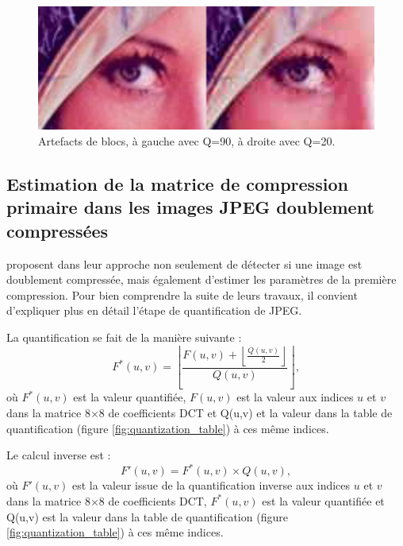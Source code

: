 \documentclass[utf8,final]{stageM2R} %
\begin{document}
\begin{figure}[H]
  \begin{center}
    \includegraphics[width=120mm]{images/eyes.png}
    \caption{Artefacts de blocs, à gauche avec Q=90, à droite avec Q=20.}
    \label{fig:blocs_artefacts}
  \end{center}
\end{figure}


\subsection{Estimation de la matrice de compression primaire dans les images JPEG doublement compressées}
\label{estimation_matrice_compression}
 \autocite{lukavs2003estimation} proposent dans leur approche non seulement de détecter si une image est doublement compressée, mais également d'estimer les paramètres de la première compression. Pour bien comprendre la suite de leurs travaux, il convient d'expliquer plus en détail l'étape de quantification de JPEG.

La quantification se fait de la manière suivante :
\begin{equation}
  F^*(u,v) = \left \lfloor \frac{F(u,v) + \left \lfloor \frac{Q(u,v)}{2} \right \rfloor }{Q(u,v)} \right \rfloor,
  \label{eqn:quantization}
\end{equation}
où $F^*(u,v)$ est la valeur quantifiée, $F(u,v)$ est la valeur aux indices $u$ et $v$ dans la matrice 8$\times$8 de coefficients DCT et Q(u,v) et la valeur dans la table de quantification (figure \ref{fig:quantization_table}) à ces même indices.

Le calcul inverse est :
\begin{equation}
  F'(u,v) = F^*(u,v)\times Q(u,v),
  \label{eqn:iquantization}
\end{equation}
où $F'(u,v)$ est la valeur issue de la quantification inverse aux indices $u$ et $v$ dans la matrice 8$\times$8 de coefficients DCT, $F^*(u,v)$ est la valeur quantifiée et Q(u,v) est la valeur dans la table de quantification (figure \ref{fig:quantization_table}) à ces même indices.
\end{document}
